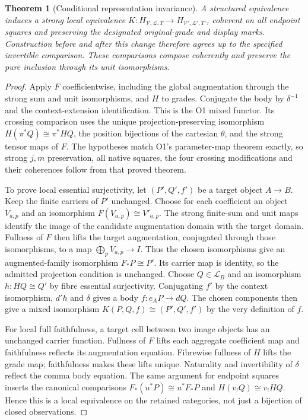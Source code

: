 \documentclass[11pt,a4paper]{article}
\newtheorem{theorem}{Theorem}[section]
\theoremstyle{definition}
\newcommand{\V}{\mathcal V}
\newcommand{\Lcat}{\mathcal L}
\begin{document}
\begin{theorem}[Conditional representation invariance]\label{thm:equivalence}
A structured equivalence induces a strong local equivalence
$K:H_{\V,\Lcat,T}\to H_{\V',\Lcat',T'}$, coherent on all endpoint
squares and preserving the designated original-grade and display marks.
Construction before and after this change therefore agrees up to the
specified invertible comparison. These comparisons compose coherently and
preserve the pure inclusion through its unit isomorphisms.
\end{theorem}
\begin{proof}
Apply $F$ coefficientwise, including the global augmentation through the
strong sum and unit isomorphisms, and $H$ to grades. Conjugate the body by
$\delta^{-1}$ and the context-extension identification. This is the O1
mixed functor. Its crossing comparison uses the unique projection-preserving
isomorphism $H(\pi^*Q)\cong\pi^*HQ$, the position bijections of the
cartesian $\theta$, and the strong tensor maps of $F$. The hypotheses match
O1's parameter-map theorem exactly, so strong $j,m$ preservation, all native
squares, the four crossing modifications and their coherences follow from
that proved theorem.

To prove local essential surjectivity, let $(P',Q',f')$ be a target object
$A\to B$. Keep the finite carriers of $P'$ unchanged. Choose for each
coefficient an object $V_{a,p}$ and an isomorphism
$F(V_{a,p})\cong V'_{a,p}$. The strong finite-sum and unit maps identify
the image of the candidate augmentation domain with the target domain.
Fullness of $F$ then lifts the target augmentation, conjugated through those
isomorphisms, to a map $\bigoplus_pV_{a,p}\to I$.
Thus the chosen isomorphisms give an augmented-family isomorphism
$F_*P\cong P'$. Its carrier map is identity, so the admitted projection
condition is unchanged. Choose $Q\in\Lcat_B$ and an isomorphism
$h:HQ\cong Q'$ by fibre essential surjectivity. Conjugating $f'$ by the
context isomorphism, $d'h$ and $\delta$ gives a body $f:e_AP\to dQ$.
The chosen components then give a mixed isomorphism
$K(P,Q,f)\cong(P',Q',f')$ by the very definition of $f$.

For local full faithfulness, a target cell between two image objects has
an unchanged carrier function. Fullness of $F$ lifts each aggregate
coefficient map and faithfulness reflects its augmentation equation.
Fibrewise fullness of $H$ lifts the grade map; faithfulness makes these
lifts unique. Naturality and invertibility of $\delta$ reflect the comma
body equation. The same argument for endpoint squares inserts the canonical
comparisons $F_*(u^*P)\cong u^*F_*P$ and $H(v_!Q)\cong v_!HQ$.
Hence this is a local equivalence on the retained categories, not just a
bijection of closed observations.


\end{proof}
\end{document}
